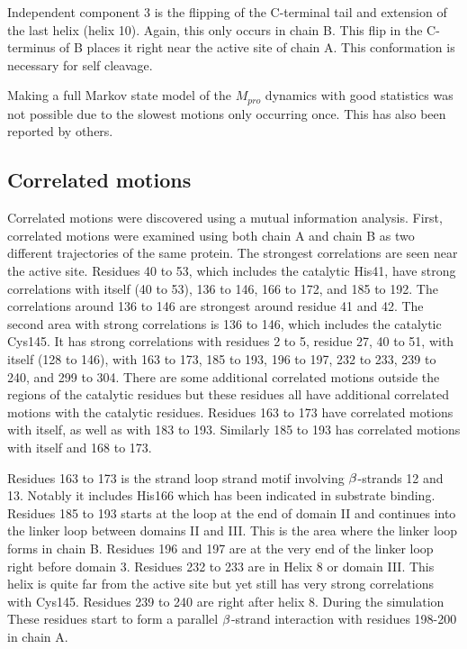 \documentclass{biophys-new}
\begin{document}
Independent component 3 is the flipping of the C-terminal tail and extension of the last helix (helix 10). Again, this only occurs in chain B. This flip in the C-terminus of B places it right near the active site of chain A. This conformation is necessary for self cleavage.\cite{muramatsu2016sars, noske2020crystallographic}

Making a full Markov state model of the $M_{pro}$ dynamics with good statistics was not possible due to the slowest motions only occurring once. This has also been reported by others. \cite{carli2020candidate, cocina2020sapphire}

\subsection*{Correlated motions}

Correlated motions were discovered using a mutual information analysis. First, correlated motions were examined using both chain A and chain B as two different trajectories of the same protein. The strongest correlations are seen near the active site. Residues 40 to 53, which includes the catalytic His41, have strong correlations with itself (40 to 53), 136 to 146, 166 to 172, and 185 to 192. The correlations around 136 to 146 are strongest around residue 41 and 42. The second area with strong correlations is 136 to 146, which includes the catalytic Cys145. It has strong correlations with residues 2 to 5, residue 27, 40 to 51, with itself (128 to 146), with 163 to 173, 185 to 193, 196 to 197, 232 to 233, 239 to 240, and 299 to 304. There are some additional correlated motions outside the regions of the catalytic residues but these residues all have additional correlated motions with the catalytic residues. Residues 163 to 173 have correlated motions with itself, as well as with 183 to 193. Similarly 185 to 193 has correlated motions with itself and 168 to 173.

Residues 163 to 173 is the strand loop strand motif involving $\MakeUppercase{\beta}$-strands 12 and 13. Notably it includes His166 which has been indicated in substrate binding. Residues 185 to 193 starts at the loop at the end of domain II and continues into the linker loop between domains II and III. This is the area where the linker loop forms in chain B. Residues 196 and 197 are at the very end of the linker loop right before domain 3. Residues 232 to 233 are in Helix 8 or domain III. This helix is quite far from the active site but yet still has very strong correlations with Cys145. Residues 239 to 240 are right after helix 8. During the simulation These residues start to form a parallel $\MakeUppercase{\beta}$-strand interaction with residues 198-200 in chain A.
\end{document}
